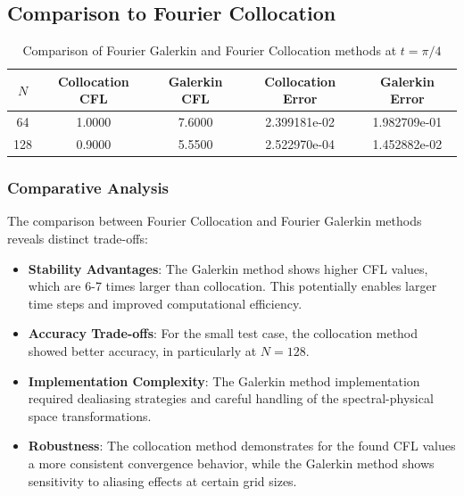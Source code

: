 \subsection{Comparison to Fourier Collocation}

\begin{table}[h]
	\centering
	\begin{tabular}{|c|c|c|c|c|}
		\hline
		$N$ & Collocation CFL & Galerkin CFL & Collocation Error & Galerkin Error \\
		\hline
		64  & 1.0000          & 7.6000       & 2.399181e-02      & 1.982709e-01   \\
		128 & 0.9000          & 5.5500       & 2.522970e-04      & 1.452882e-02   \\
		\hline
	\end{tabular}
	\caption{Comparison of Fourier Galerkin and Fourier Collocation methods at $t = \pi/4$}
	\label{tab:comparison}
\end{table}

\subsubsection{Comparative Analysis}
The comparison between Fourier Collocation and Fourier Galerkin methods reveals distinct trade-offs:
%
\begin{itemize}
	\item \textbf{Stability Advantages}: The Galerkin method shows higher CFL values, which are 6-7 times larger than collocation. This potentially enables larger time steps and improved computational efficiency.
	\item \textbf{Accuracy Trade-offs}: For the small test case, the collocation method showed better accuracy, in particularly at $N=128$.
	\item \textbf{Implementation Complexity}: The Galerkin method implementation required dealiasing strategies and careful handling of the spectral-physical space transformations.
	\item \textbf{Robustness}: The collocation method demonstrates for the found CFL values a more consistent convergence behavior, while the Galerkin method shows sensitivity to aliasing effects at certain grid sizes.
\end{itemize}
